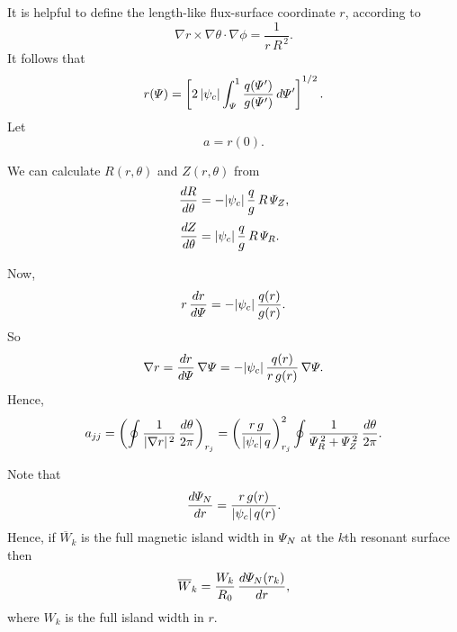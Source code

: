\documentclass[notitlepage,12pt]{article}
\begin{document}
It is helpful to define the length-like flux-surface coordinate $r$, according to
\begin{equation}
\nabla r\times \nabla\theta\cdot\nabla \phi = \frac{1}{r\,R^{\,2}}.
\end{equation}
It follows that
\begin{equation}
r({\mit\Psi}) = \left[2\,|\psi_c|\int_{{\mit\Psi}}^1\frac{q({\mit\Psi}')}
{g({\mit\Psi}')}\,d{\mit\Psi}'\right]^{1/2}.
\end{equation}
Let
\begin{equation}
a = r (0).
\end{equation}

We can calculate $R(r,\theta)$ and $Z(r,\theta)$ from 
\begin{align}
\frac{dR}{d\theta}&=-|\psi_c|\,\frac{q}{g}\,R\,{\mit\Psi}_Z,\\[0.5ex]
\frac{dZ}{d\theta} &= |\psi_c|\,\frac{q}{g}\,R\,{\mit\Psi}_R.
\end{align}

Now,
\begin{equation}
r\,\frac{dr}{d{\mit\Psi}} = -|\psi_c|\,\frac{q(r)}{g(r)}.
\end{equation}
So
\begin{equation}
\nabla r = \frac{dr}{d{\mit\Psi}}\,\nabla{\mit\Psi} = -|\psi_c|\,\frac{q(r)}{r\,g(r)}\,\nabla{\mit\Psi}.
\end{equation}
Hence,
\begin{equation}
a_{jj}  =\left(\oint \frac{1}{|\nabla r|^{\,2}}\,\frac{d\theta}{2\pi}\right)_{r_j} = \left(\frac{r\,g}{|\psi_c|\,q}\right)^2_{r_j}\oint
\frac{1}{{\mit\Psi}_R^{\,2}+{\mit\Psi}_Z^{\,2}}\,\frac{d\theta}{2\pi}.
\end{equation}

Note that
\begin{equation}
\frac{d{\mit\Psi}_N}{dr} =\frac{r\,g(r)}{|\psi_c|\,q(r)}.
\end{equation}
Hence, if $\overline{W}_k$ is the full magnetic island width in ${\mit\Psi}_N$ at the 
$k$th resonant surface then
\begin{equation}
\overline{W}_k = \frac{W_k}{R_0}\,\frac{d{\mit\Psi}_N(r_k)}{dr},
\end{equation}
where $W_k$ is the full island width in $r$. 
\end{document}
